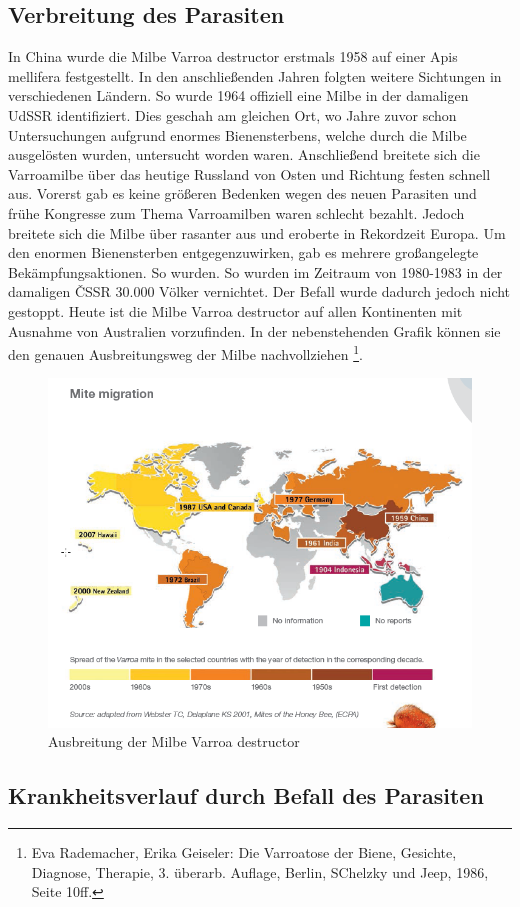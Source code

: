 \documentclass[11pt,a4paper]{article}
\begin{document}
\subsection{Verbreitung des Parasiten}
In China wurde die Milbe Varroa destructor erstmals 1958 auf einer Apis mellifera festgestellt. In den anschließenden Jahren folgten weitere Sichtungen in verschiedenen Ländern. So wurde 1964 offiziell eine Milbe in der damaligen UdSSR identifiziert. Dies geschah am gleichen Ort, wo Jahre zuvor schon Untersuchungen aufgrund enormes Bienensterbens, welche durch die Milbe ausgelösten wurden, untersucht worden waren. Anschließend breitete sich die Varroamilbe über das heutige Russland von Osten und Richtung festen schnell aus. Vorerst gab es keine größeren Bedenken wegen des neuen Parasiten und frühe Kongresse zum Thema Varroamilben waren schlecht bezahlt. Jedoch breitete sich die Milbe über rasanter aus und eroberte in Rekordzeit Europa. Um den enormen Bienensterben entgegenzuwirken, gab es mehrere großangelegte Bekämpfungsaktionen. So wurden. So wurden im Zeitraum von 1980-1983 in der damaligen ČSSR 30.000 Völker vernichtet. Der Befall wurde dadurch jedoch nicht gestoppt. Heute ist die Milbe Varroa destructor auf allen Kontinenten mit Ausnahme von Australien vorzufinden. In der nebenstehenden Grafik können sie den genauen Ausbreitungsweg der Milbe nachvollziehen \footnote{Eva Rademacher, Erika Geiseler: Die Varroatose der Biene, Gesichte, Diagnose, Therapie, 3. überarb. Auflage, Berlin, SChelzky und Jeep, 1986, Seite 10ff.}.
\begin{figure}[H]
    \centering
    \includegraphics[width = .7\textwidth]{images/Verbreitung Varroamilbe.png}
    \caption{Ausbreitung der Milbe Varroa destructor}
    \label{fig:annotated_edited}
\end{figure}
\subsection{Krankheitsverlauf durch Befall des Parasiten}
\end{document}
